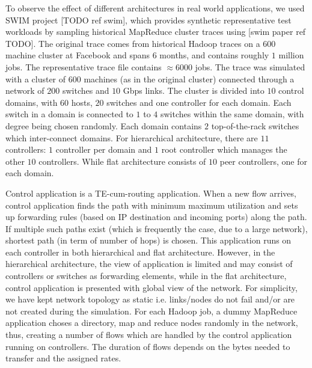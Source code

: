 \documentclass[10pt, twocolumn]{article}
\begin{document}
To observe the effect of different architectures in real world applications, we used SWIM project [TODO ref swim], which provides synthetic representative test workloads  by sampling historical MapReduce cluster traces using [swim paper ref TODO]. The original trace comes from historical Hadoop traces on a 600 machine cluster at Facebook and spans $6$ months, and contains roughly $1$ million jobs. The representative trace file contains $\approx 6000$ jobs. The trace was simulated with a cluster of $600$ machines (as in the original cluster) connected through a network of $200$ switches and $10$ Gbps links. The cluster is divided into $10$ control domains, with $60$ hosts, $20$ switches and one controller for each domain. Each switch in a domain is connected to $1$ to $4$ switches within the same domain, with degree being chosen randomly. Each domain contains $2$ top-of-the-rack switches which inter-connect domains. For hierarchical architecture, there are $11$ controllers: $1$ controller per domain and $1$ root controller which manages the other $10$ controllers. While flat architecture consists of $10$ peer controllers, one for each domain.

Control application is a TE-cum-routing application. When a new flow arrives, control application finds the path with minimum maximum utilization and sets up forwarding rules (based on IP destination and incoming ports) along the path. If multiple such paths exist (which is frequently the case, due to a large network), shortest path (in term of number of hops) is chosen. This application runs on each controller in both hierarchical and flat architecture. However, in the hierarchical architecture, the view of application is limited and may consist of controllers or switches as forwarding elements, while in the flat architecture, control application is presented with global view of the network. For simplicity, we have kept network topology as static i.e. links/nodes do not fail and/or are not created during the simulation. For each Hadoop job, a dummy MapReduce application choses a directory, map and reduce nodes randomly in the network, thus, creating a number of flows which are handled by the control application running on controllers. The duration of flows depends on the bytes needed to transfer and the assigned rates.            
\end{document}
